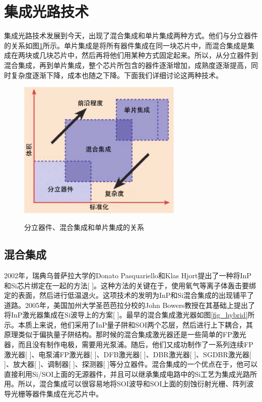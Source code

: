\documentclass{ZJUthesis}
\begin{document}
\section{集成光路技术}

集成光路技术发展到今天，出现了混合集成和单片集成两种方式。他们与分立器件的关系如图\ref{fig_integrations}所示。单片集成是将所有器件集成在同一块芯片中，而混合集成是集成在两块或几块芯片中，然后再将他们用某种方式固定起来。所以，从分立器件到混合集成，再到单片集成，整个芯片所包含的器件逐渐增加，成熟度逐渐提高，同时复杂度逐渐下降，成本也随之下降。下面我们详细讨论这两种技术。

\begin{figure}[!ht]
  \centering
  \includegraphics[width=0.7\textwidth]{./Pictures/integrations.eps}\\
  \caption{分立器件、混合集成和单片集成的关系}
  \label{fig_integrations}
\end{figure}

\subsection{混合集成}

2002年，瑞典乌普萨拉大学的Donato Pasquariello和Klas Hjort提出了一种将InP和Si芯片绑定在一起的方法[ ]。这种方法的关键在于，使用氧气等离子体轰击要绑定的表面，然后进行低温退火。这项技术的发明为InP和Si混合集成的出现铺平了道路。2005年，美国加州大学圣芭芭拉分校的John Bowers教授在其基础上提出了将InP激光器集成在Si波导上的方案[ ]。最早的混合集成激光器如图\ref{fig_hybrid}所示。本质上来说，他们采用了InP量子阱和SOI两个芯层，然后进行上下耦合，其原理类似于偏执量子阱结构。那时候的混合集成激光器还是一些简单的FP激光器，而且没有制作电极，需要用光泵浦。随后，他们又成功制作了一系列连续FP激光器[ ]、电泵浦FP激光器[ ]、DFB激光器[ ]、DBR激光器[ ]、SGDBR激光器[ ]、放大器[ ]、调制器[ ]、探测器[ ]等分立器件。混合集成的一个优点在于，他可以直接利用Si/SOI上面的无源器件，并且可以继承集成电路中的Si工艺为集成光路所用。所以，混合集成可以很容易地将SOI波导和SOI上面的刻蚀衍射光栅、阵列波导光栅等器件集成在光芯片中。
\end{document}
